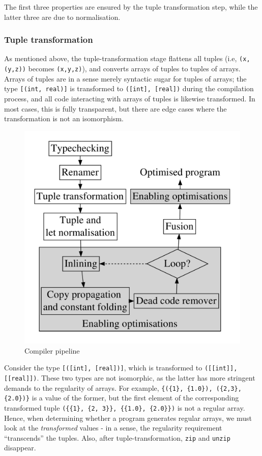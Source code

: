 \documentclass{sigplanconf}  %
\begin{document}
The first three properties are ensured by the tuple transformation
step, while the latter three are due to normalisation.

\subsubsection{Tuple transformation}
\label{sec:tuple-transformation}

As mentioned above, the tuple-transformation stage flattens all tuples
(i.e, {\tt (x,(y,z))} becomes {\tt (x,y,z)}), and converts arrays of
tuples to tuples of arrays.  Arrays of tuples are in a sense merely
syntactic sugar for tuples of arrays; the type {\tt [(int, real)]} is
transformed to {\tt ([int], [real])} during the compilation process,
and all code interacting with arrays of tuples is likewise
transformed.  In most cases, this is fully transparent, but there are
edge cases where the transformation is not an isomorphism.

\begin{figure}[bt]
\begin{center}
\includegraphics[width=0.7\columnwidth]{Figures/pipeline}
\end{center}
\caption{Compiler pipeline}
\label{fig:l0cpipeline}
\end{figure}

Consider the type {\tt [([int], [real])]}, which is transformed to
{\tt([[int]], [[real]])}.  These two types are not isomorphic, as the
latter has more stringent demands to the regularity of arrays.  For
example, {\tt\{(\{1\}, \{1.0\}), (\{2,3\}, \{2.0\})\}} is a value of
the former, but the first element of the corresponding transformed
tuple {\tt(\{\{1\}, \{2, 3\}\}, \{\{1.0\}, \{2.0\}\})} is not a regular
array.  Hence, when determining whether a program generates regular
arrays, we must look at the \textit{transformed} values - in a sense,
the regularity requirement ``transcends'' the tuples.  Also, after
tuple-transformation, {\tt zip} and {\tt unzip} disappear.
\end{document}
